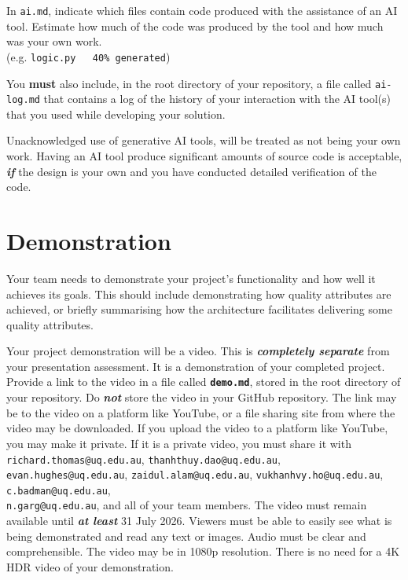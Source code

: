 \documentclass{csse4400}
\begin{document}
In \texttt{ai.md}, indicate which files contain code produced with the assistance of an AI tool.
Estimate how much of the code was produced by the tool and how much was your own work.\\
(e.g. \texttt{logic.py ~~40\% generated})

You \textbf{must} also include, in the root directory of your repository,
a file called \texttt{ai-log.md} that contains a log of the history of your interaction with the AI tool(s)
that you used while developing your solution.

Unacknowledged use of generative AI tools, will be treated as not being your own work.
Having an AI tool produce significant amounts of source code is acceptable,
\textbf{\textit{if}} the design is your own and you have conducted detailed verification of the code.


\section{Demonstration}
Your team needs to demonstrate your project's functionality and how well it achieves its goals.
This should include demonstrating how quality attributes are achieved,
or briefly summarising how the architecture facilitates delivering some quality attributes.

Your project demonstration will be a video.
This is \textbf{\textit{completely separate}} from your presentation assessment.
It is a demonstration of your completed project.
Provide a link to the video in a file called \textbf{\texttt{demo.md}}, stored in the root directory of your repository.
Do \textbf{\textit{not}} store the video in your GitHub repository.
The link may be to the video on a platform like YouTube, or a file sharing site from where the video may be downloaded.
If you upload the video to a platform like YouTube, you may make it private.
If it is a private video, you must share it with \texttt{richard.thomas@uq.edu.au},
\texttt{thanhthuy.dao@uq.edu.au}, \texttt{evan.hughes@uq.edu.au}, \texttt{zaidul.alam@uq.edu.au},
\texttt{vukhanhvy.ho@uq.edu.au}, \texttt{c.badman@uq.edu.au}, \\
\texttt{n.garg@uq.edu.au}, and all of your team members.
The video must remain available until \textbf{\textit{at least}} 31 July 2026.
Viewers must be able to easily see what is being demonstrated and read any text or images.
Audio must be clear and comprehensible.
The video may be in 1080p resolution.
There is no need for a 4K HDR video of your demonstration.
\end{document}
